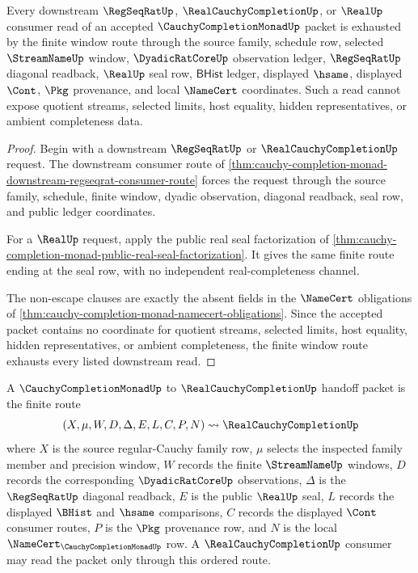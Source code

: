 \begin{theorem}
\label{thm:cauchy-completion-monad-finite-window-exhaustion}
Every downstream $\RegSeqRatUp$, $\RealCauchyCompletionUp$, or $\RealUp$ consumer read of an accepted $\CauchyCompletionMonadUp$ packet is exhausted by the finite window route through the source family, schedule row, selected $\StreamNameUp$ window, $\DyadicRatCoreUp$ observation ledger, $\RegSeqRatUp$ diagonal readback, $\RealUp$ seal row, $\mathsf{BHist}$ ledger, displayed $\hsame$, displayed $\Cont$, $\Pkg$ provenance, and local $\NameCert$ coordinates. Such a read cannot expose quotient streams, selected limits, host equality, hidden representatives, or ambient completeness data.
\end{theorem}
\begin{proof}
Begin with a downstream $\RegSeqRatUp$ or $\RealCauchyCompletionUp$ request. The downstream consumer route of \autoref{thm:cauchy-completion-monad-downstream-regseqrat-consumer-route} forces the request through the source family, schedule, finite window, dyadic observation, diagonal readback, seal row, and public ledger coordinates.

For a $\RealUp$ request, apply the public real seal factorization of \autoref{thm:cauchy-completion-monad-public-real-seal-factorization}. It gives the same finite route ending at the seal row, with no independent real-completeness channel.

The non-escape clauses are exactly the absent fields in the $\NameCert$ obligations of \autoref{thm:cauchy-completion-monad-namecert-obligations}. Since the accepted packet contains no coordinate for quotient streams, selected limits, host equality, hidden representatives, or ambient completeness, the finite window route exhausts every listed downstream read.
\end{proof}

\begin{definition}
\label{def:cauchy-completion-monad-realcompletion-handoff-packet}
A $\CauchyCompletionMonadUp$ to $\RealCauchyCompletionUp$ handoff packet is the finite route
$$
(X,\mu,W,D,\Delta,E,L,C,P,N)
\rightsquigarrow
\RealCauchyCompletionUp
$$
where $X$ is the source regular-Cauchy family row, $\mu$ selects the inspected family member and precision window, $W$ records the finite $\StreamNameUp$ windows, $D$ records the corresponding $\DyadicRatCoreUp$ observations, $\Delta$ is the $\RegSeqRatUp$ diagonal readback, $E$ is the public $\RealUp$ seal, $L$ records the displayed $\BHist$ and $\hsame$ comparisons, $C$ records the displayed $\Cont$ consumer routes, $P$ is the $\Pkg$ provenance row, and $N$ is the local $\NameCert_{\CauchyCompletionMonadUp}$ row. A $\RealCauchyCompletionUp$ consumer may read the packet only through this ordered route.
\end{definition}

